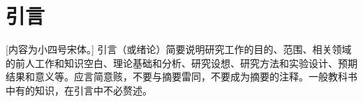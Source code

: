  \setlength{\baselineskip}{20pt}
\chapter{引言}
\label{cha:intro}


[内容为小四号宋体。] 引言（或绪论）简要说明研究工作的目的、范围、相关领域的前人工作和知识空白、理论基础和分析、研究设想、研究方法和实验设计、预期结果和意义等。应言简意赅，不要与摘要雷同，不要成为摘要的注释。一般教科书中有的知识，在引言中不必赘述。



